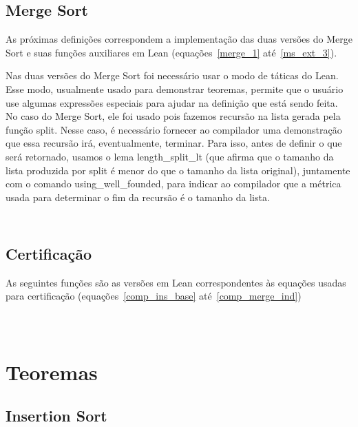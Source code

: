 \documentclass[12pt, oneside, a4paper,english,brazil]{abntex2}
\begin{document}
\subsection{Merge Sort}

As pr\'oximas defini\c{c}\~oes correspondem a implementa\c{c}\~ao das duas
vers\~oes do Merge Sort e suas fun\c{c}\~oes auxiliares em Lean
(equa\c{c}\~oes~\ref{merge_1} at\'e~\ref{ms_ext_3}).


Nas duas vers\~oes do Merge Sort foi necess\'ario usar o modo de t\'aticas do Lean.
Esse modo, usualmente usado para demonstrar teoremas, permite que o usu\'ario use
algumas express\~oes especiais para ajudar na defini\c{c}\~ao que est\'a sendo
feita. No caso do Merge Sort, ele foi usado pois fazemos recurs\~ao na lista gerada
pela fun\c{c}\~ao split. Nesse caso, \'e necess\'ario fornecer ao compilador uma
demonstra\c{c}\~ao que essa recurs\~ao ir\'a, eventualmente, terminar. Para isso,
antes de definir o que ser\'a retornado, usamos o lema \textsf{length\_split\_lt} (que afirma que o tamanho da lista produzida por \textsf{split} \'e menor do que o tamanho da lista original), juntamente com o comando \textsf{using\_well\_founded}, para indicar ao compilador que a m\'etrica usada para determinar o fim da recurs\~ao \'e o tamanho da lista.

\inputminted{lean}{merge_sort.lean}
\inputminted{lean}{merge_sort_modified.lean}

\subsection{Certifica\c{c}\~ao}

As seguintes fun\c{c}\~oes s\~ao as vers\~oes em Lean correspondentes \`as
equa\c{c}\~oes usadas para certifica\c{c}\~ao (equa\c{c}\~oes~\ref{comp_ins_base} at\'e~\ref{comp_merge_ind})

\inputminted{lean}{ins_comp.lean}
\inputminted{lean}{remove_pref.lean}
\inputminted{lean}{merge_comp.lean}

\section{Teoremas}

\subsection{Insertion Sort}

\inputminted{lean}{ins_complexity.lean}
\end{document}
